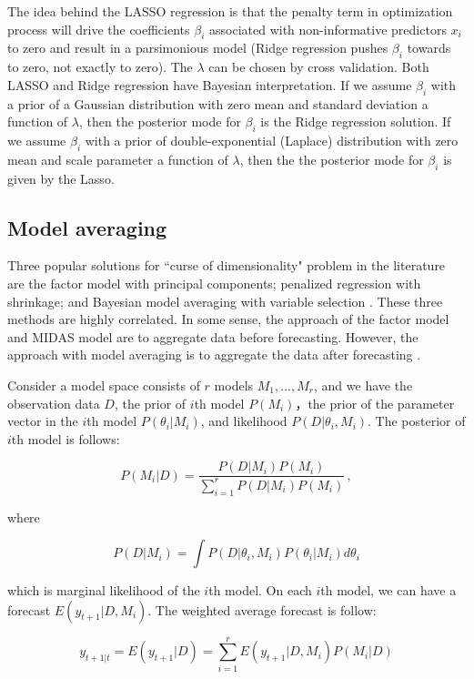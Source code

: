 The idea behind the LASSO  regression is that the penalty term in optimization process will drive the coefficients $\beta_i$  associated with non-informative predictors $x_i$  to zero and result in a parsimonious model (Ridge regression pushes $\beta_i$ towards to zero, not exactly to zero). The $\lambda$ can be chosen by cross validation. Both LASSO and Ridge regression have Bayesian interpretation. If we assume $\beta_i$ with a prior of a Gaussian distribution with zero mean and standard deviation a function of $\lambda$, then the posterior mode for $\beta_i$ is the Ridge regression solution. If we assume $\beta_i$ with a prior of double-exponential (Laplace) distribution with zero mean and scale parameter a function of $\lambda$, then the the posterior mode for $\beta_i$ is given by the Lasso. \cite{James2013}

\subsection{Model averaging}  
Three popular solutions for ``curse of dimensionality" problem  in the literature are the factor model with principal components; penalized regression with shrinkage; and Bayesian model averaging with variable selection \cite{DeMol2008,Ouysse2013} . These three methods are highly correlated. In some sense, the approach of the factor model and MIDAS model are to aggregate data before forecasting. However, the approach with model averaging is to aggregate the data after forecasting \cite{Hendry2011} . 

Consider a model space consists of $r$ models $M_1, ..., M_r$, and we have the observation data $D$, the prior of $i$th model $P(M_i)$，the prior of the parameter vector in the  $i$th model $P(\theta_i|M_i)$, and likelihood $P(D|\theta_i,M_i)$. The posterior of $i$th model is follows:

$$P(M_i|D) = \frac{P(D|M_i) P(M_i)}{ \sum_{i=1}^{r} P(D|M_i) P(M_i)} \, ,  $$

where 

$$P(D|M_i) = \int P(D|\theta_i,M_i) P(\theta_i|M_i) d\theta_i $$

which is marginal likelihood of the $i$th model. On each $i$th model, we can have a forecast $E(y_{t+1} |D, M_i)$. The weighted average forecast is follow:

$$y_{t+1|t} = E(y_{t+1} |D) = \sum_{i=1}^{r} E(y_{t+1} |D, M_i) P(M_i|D) $$  


